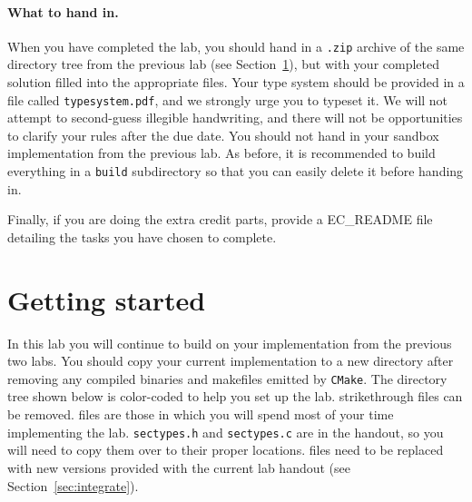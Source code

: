 \documentclass[11pt]{article}
\begin{document}
{\paragraph{What to hand in.} When you have completed the lab, you should hand in a \verb'.zip' archive of the same directory 
tree from the previous lab (see Section~\ref{sect:start}), but with your completed solution filled into the appropriate files.
 Your type system should be provided in a file called \verb'typesystem.pdf', and we strongly urge you to typeset it. We will 
 not attempt to second-guess illegible handwriting, and there will not be opportunities to clarify your rules after the due date. 
 You should not hand in your sandbox implementation from the previous lab. As before, it is recommended to build everything in a 
 \verb'build' subdirectory so that you can easily delete it before handing in.

Finally, if you are doing the extra credit parts, provide a EC\_README file detailing the tasks you have chosen to complete. 

\newpage
\section{Getting started}
\label{sect:start}

In this lab you will continue to build on your implementation from the previous two labs. You should copy your current 
implementation to a new directory after removing any compiled binaries and makefiles emitted by \verb'CMake'.
The directory tree shown below is color-coded to help you set up the lab. {} strikethrough 
files can be removed. {\color{blue}{Blue}} files are those in which you will spend most of your time implementing the 
lab. \verb'sectypes.h' and \verb'sectypes.c' are in the handout, so you will need to copy 
them over to their proper locations. {\color{Purple}{Purple}} files need to be replaced with new 
versions provided with the current lab handout (see Section~\ref{sec:integrate}).
\\

}
\end{document}
